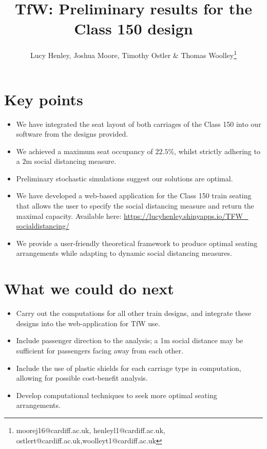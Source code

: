 \documentclass[11pt,a4paper]{article}
\title{TfW: Preliminary results for the Class 150 design}
\author{Lucy Henley, Joshua Moore, Timothy Ostler \& Thomas Woolley\footnote{moorej16@cardiff.ac.uk, henleyl1@cardiff.ac.uk, ostlert@cardiff.ac.uk,woolleyt1@cardiff.ac.uk}}
\begin{document}
\maketitle

\section*{Key points}
\begin{itemize}
\item We have integrated the seat layout of both carriages of the Class 150 into our software from the designs provided.
\item We achieved a maximum seat occupancy of $22.5\%$, whilst strictly adhering to a $2$m social distancing measure. 
\item Preliminary stochastic simulations suggest our solutions are optimal.
\item We have developed a web-based application for the Class 150 train seating that allows the user to specify the social distancing measure and return the maximal capacity. Available here: \href{https://lucyhenley.shinyapps.io/TFW_socialdistancing/}{https://lucyhenley.shinyapps.io/TFW\_ socialdistancing/}
\item We provide a user-friendly theoretical framework to produce optimal seating arrangements while adapting to dynamic social distancing measures.
\end{itemize}

\section*{What we could do next}
\begin{itemize}
\item Carry out the computations for all other train designs, and integrate these designs into the web-application for TfW use.
\item Include passenger direction to the analysis; a 1m social distance may be sufficient for passengers facing away from each other.
\item Include the use of plastic shields for each carriage type in computation, allowing for possible cost-benefit analysis.
\item Develop computational techniques to seek more optimal seating arrangements.
\end{itemize}
\end{document}
